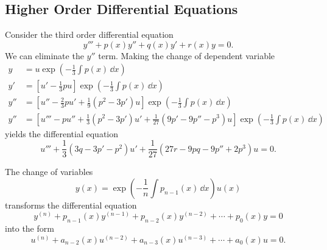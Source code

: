 \subsection{Higher Order Differential Equations}

Consider the third order differential equation
\[
y''' + p(x) y'' + q(x) y' + r(x) y = 0.
\]
We can eliminate the $y''$ term.
Making the change of dependent variable 
\begin{align*}
  y &= u \exp\left( - \frac{1}{3} \int p(x)\,\dd x \right) \\
  y' &= \left[u' -\frac{1}{3} p u \right] 
  \exp\left( - \frac{1}{3} \int p(x)\,\dd x \right) \\
  y'' &= \left[u'' -\frac{2}{3} p u' +\frac{1}{9} (p^2 - 3 p') u \right] 
  \exp\left( - \frac{1}{3} \int p(x)\,\dd x \right) \\
  y'' &= \left[u''' - p u'' +\frac{1}{3} (p^2- 3 p') u'
    +\frac{1}{27} (9p' - 9p'' - p^3 ) u \right] 
  \exp\left( - \frac{1}{3} \int p(x)\,\dd x \right) 
\end{align*}
yields the differential equation
\[
u''' + \frac{1}{3} (3 q - 3 p' - p^2) u' + \frac{1}{27} (27 r - 9 p q
-9 p'' + 2 p^3 ) u = 0.
\]



\begin{Result}
  The change of variables
  \[
  y(x) = \exp\left( - \frac{1}{n} \int p_{n-1}(x) \,\dd x \right) u(x)
  \]
  transforms the differential equation
  \[
  y^{(n)} + p_{n-1}(x) y^{(n-1)} + p_{n-2}(x) y^{(n-2)} + \cdots + p_0(x) y = 0
  \]
  into the form
  \[
  u^{(n)} + a_{n-2}(x) u^{(n-2)} + a_{n-3}(x) u^{(n-3)} + \cdots + a_0(x) u = 0.
  \]
\end{Result}










